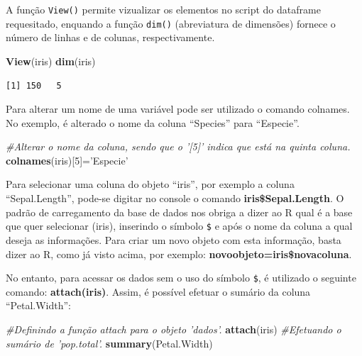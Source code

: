 \documentclass[12pt,brazil,oneside]{book}
\newenvironment{Shaded}{\begin{snugshade}}{\end{snugshade}}
\newcommand{\CommentTok}[1]{\textcolor[rgb]{0.56,0.35,0.01}{\textit{#1}}}
\newcommand{\DecValTok}[1]{\textcolor[rgb]{0.00,0.00,0.81}{#1}}
\newcommand{\KeywordTok}[1]{\textcolor[rgb]{0.13,0.29,0.53}{\textbf{#1}}}
\newcommand{\NormalTok}[1]{#1}
\newcommand{\StringTok}[1]{\textcolor[rgb]{0.31,0.60,0.02}{#1}}
\begin{document}
A função \texttt{View()} permite vizualizar os elementos no script do dataframe requesitado, enquando a função \texttt{dim()} (abreviatura de dimensões) fornece o número de linhas e de colunas, respectivamente.

\begin{Shaded}
\begin{Highlighting}[]
\KeywordTok{View}\NormalTok{(iris)}
\KeywordTok{dim}\NormalTok{(iris)}
\end{Highlighting}
\end{Shaded}

\begin{verbatim}
[1] 150   5
\end{verbatim}

Para alterar um nome de uma variável pode ser utilizado o comando colnames. No exemplo, é alterado o nome da coluna ``Species'' para ``Especie''.

\begin{Shaded}
\begin{Highlighting}[]
\CommentTok{#Alterar o nome da coluna, sendo que o '[5]' indica que está na quinta coluna.}
\KeywordTok{colnames}\NormalTok{(iris)[}\DecValTok{5}\NormalTok{]=}\StringTok{'Especie'}
\end{Highlighting}
\end{Shaded}

Para selecionar uma coluna do objeto ``iris'', por exemplo a coluna ``Sepal.Length'', pode-se digitar no console o comando \textbf{iris\$Sepal.Length}. O padrão de carregamento da base de dados nos obriga a dizer ao R qual é a base que quer selecionar (iris), inserindo o símbolo \texttt{\$} e após o nome da coluna a qual deseja as informações. Para criar um novo objeto com esta informação, basta dizer ao R, como já visto acima, por exemplo: \textbf{novoobjeto=iris\$novacoluna}.

No entanto, para acessar os dados sem o uso do símbolo \texttt{\$}, é utilizado o seguinte comando: \textbf{attach(iris)}. Assim, é possível efetuar o sumário da coluna ``Petal.Width'':

\begin{Shaded}
\begin{Highlighting}[]
\CommentTok{#Definindo a função attach para o objeto 'dados'.}
\KeywordTok{attach}\NormalTok{(iris)}
\CommentTok{#Efetuando o sumário de 'pop.total'.}
\KeywordTok{summary}\NormalTok{(Petal.Width)}
\end{Highlighting}
\end{Shaded}
\end{document}
